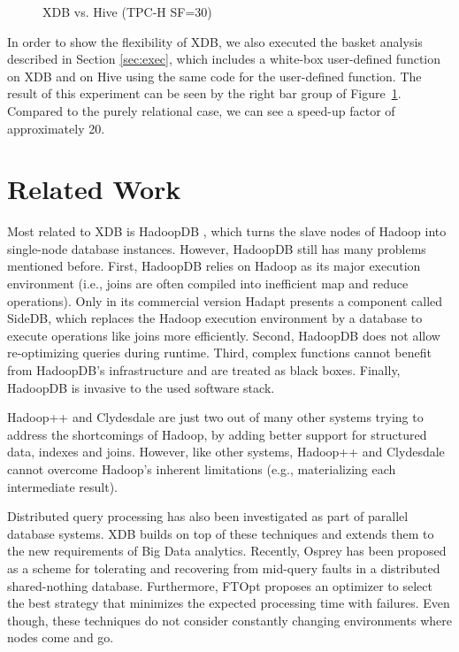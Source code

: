 \documentclass{sig-alternate}
\begin{document}
\begin{figure}[ht] 
\hspace{-4ex}
\vspace{-4ex}
\caption{XDB vs. Hive (TPC-H SF=30)}
\vspace{-1ex}
\label{fig:perf}
\end{figure}

In order to show the flexibility of XDB, we also executed the basket analysis described in Section \ref{sec:exec}, which includes a white-box user-defined function on XDB and on Hive using the same code for the user-defined function. The result of this experiment can be seen by the right bar group of Figure~\ref{fig:perf}. Compared to the purely relational case, we can see a speed-up factor of approximately 20. 

\section{Related Work}
\label{sec:rel}

Most related to XDB is HadoopDB \cite{HadoopDB:SIGMOD:2010}, which turns the slave nodes of Hadoop into single-node database instances. However, HadoopDB still has many problems mentioned before. First, HadoopDB relies on Hadoop as its major execution environment (i.e., joins are often compiled into inefficient map and reduce operations). Only in its commercial version Hadapt \cite{Hadapt:SIGMOD:2011} presents a component called SideDB, which replaces the Hadoop execution environment by a database to execute operations like joins more efficiently. Second, HadoopDB does not allow re-optimizing queries during runtime. Third, complex functions cannot benefit from HadoopDB's infrastructure and are treated as black boxes. Finally, HadoopDB is invasive to the used software stack. 

Hadoop++ \cite{HadoopPP:PVLDB:2010} and 	Clydesdale \cite{Clydesdale:EDBT:2012} are just two out of many other systems trying to address the shortcomings of Hadoop, by adding better support for structured data, indexes and joins. However, like other systems, Hadoop++ and Clydesdale cannot overcome Hadoop's inherent limitations (e.g., materializing each intermediate result).

Distributed query processing has also been investigated as part of parallel database systems. XDB builds on top of these techniques and extends them to the new requirements of Big Data analytics. Recently, Osprey \cite{Osprey:EDBT:2012} has been proposed as a scheme for tolerating and recovering from mid-query faults in a distributed shared-nothing database. Furthermore, FTOpt \cite{FOpt:SIGMOD:2011} proposes an optimizer to select the best strategy that minimizes the expected processing time with failures. Even though, these techniques do not consider constantly changing environments where nodes come and go.
\end{document}
